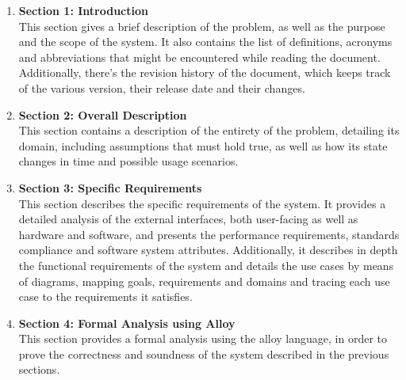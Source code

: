 \begin{enumerate}
    \item \textbf{Section 1: Introduction} \\
          This section gives a brief description of the problem, as well as the purpose and the scope of
          the system.
          It also contains the list of definitions, acronyms and abbreviations that might be encountered
          while reading the document.
          Additionally, there's the revision history of the document, which keeps track of the various
          version, their release date and their changes.
    \item \textbf{Section 2: Overall Description} \\
          This section contains a description of the entirety of the problem, detailing its domain,
          including assumptions that must hold true, as well as how its state changes in time
          and possible usage scenarios.
    \item \textbf{Section 3: Specific Requirements} \\
          This section describes the specific requirements of the system. It provides a detailed analysis
          of the external interfaces, both user-facing as well as hardware and software, and presents the
          performance requirements, standards compliance and software system attributes.
          Additionally, it describes in depth the functional requirements of the system and details the
          use cases by means of diagrams, mapping goals, requirements and domains and tracing each use
          case to the requirements it satisfies.
    \item \textbf{Section 4: Formal Analysis using Alloy} \\
          This section provides a formal analysis using the alloy language, in order
          to prove the correctness and soundness of the system described in the previous sections.
\end{enumerate}